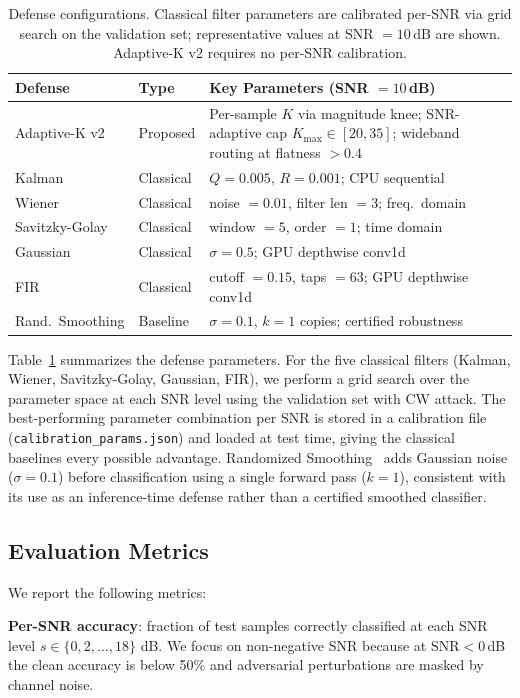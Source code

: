 \begin{table}[t]
\caption{Defense configurations. Classical filter parameters are calibrated
  per-SNR via grid search on the validation set; representative values at
  SNR $= 10$\,dB are shown. Adaptive-K v2 requires no per-SNR calibration.}
\label{tab:defenses}
\centering
\small
\begin{tabular}{llp{4.5cm}}
\toprule
Defense & Type & Key Parameters (SNR $= 10$\,dB) \\
\midrule
Adaptive-K v2   & Proposed & Per-sample $K$ via magnitude knee; SNR-adaptive cap $K_{\max}\in[20,35]$; wideband routing at flatness $>0.4$ \\
Kalman          & Classical & $Q=0.005$, $R=0.001$; CPU sequential \\
Wiener          & Classical & noise $= 0.01$, filter len $= 3$; freq.\ domain \\
Savitzky-Golay  & Classical & window $= 5$, order $= 1$; time domain \\
Gaussian        & Classical & $\sigma=0.5$; GPU depthwise conv1d \\
FIR             & Classical & cutoff $= 0.15$, taps $= 63$; GPU depthwise conv1d \\
Rand.\ Smoothing & Baseline  & $\sigma=0.1$, $k=1$ copies; certified robustness \\
\bottomrule
\end{tabular}
\end{table}

Table~\ref{tab:defenses} summarizes the defense parameters.  For the five
classical filters (Kalman, Wiener, Savitzky-Golay, Gaussian, FIR), we perform
a grid search over the parameter space at each SNR level using the validation
set with CW attack.  The best-performing parameter combination per SNR is stored
in a calibration file (\texttt{calibration\_params.json}) and loaded at test
time, giving the classical baselines every possible advantage.  Randomized
Smoothing~\cite{cohen2019certified} adds Gaussian noise ($\sigma=0.1$) before
classification using a single forward pass ($k=1$), consistent with its use
as an inference-time defense rather than a certified smoothed classifier.

\subsection{Evaluation Metrics}

We report the following metrics:

\textbf{Per-SNR accuracy}: fraction of test samples correctly classified at
each SNR level $s \in \{0, 2, \ldots, 18\}$ dB.  We focus on non-negative SNR
because at $\text{SNR} < 0$\,dB the clean accuracy is below 50\% and adversarial
perturbations are masked by channel noise.

